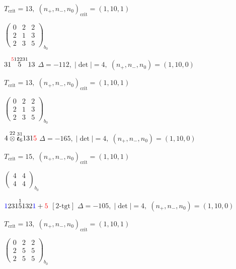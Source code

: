\documentclass[10pt]{article}
\begin{document}
\hspace{1em}$T_{\text{crit}}=13,\; (n_+,n_-,n_0)_{\text{crit}}=(1,10,1)$

\hspace{2em}$\left(\begin{smallmatrix}0 & 2 & 2 \\ 2 & 1 & 3 \\ 2 & 3 & 5\end{smallmatrix}\right)_{\!b_0}$

\smallskip

$31\overset{\textcolor{red}{5}12231}{5}13$ \quad $\Delta=-112,\; |\det|=4,\; (n_+,n_-,n_0)=(1,10,0)$

\hspace{1em}$T_{\text{crit}}=13,\; (n_+,n_-,n_0)_{\text{crit}}=(1,10,1)$

\hspace{2em}$\left(\begin{smallmatrix}0 & 2 & 2 \\ 2 & 1 & 3 \\ 2 & 3 & 5\end{smallmatrix}\right)_{\!b_0}$

\smallskip

$4\overset{22}{\otimes}\overset{31}{\mathfrak{e}_6}131\textcolor{red}{5}$ \quad $\Delta=-165,\; |\det|=4,\; (n_+,n_-,n_0)=(1,10,0)$

\hspace{1em}$T_{\text{crit}}=15,\; (n_+,n_-,n_0)_{\text{crit}}=(1,10,1)$

\hspace{2em}$\left(\begin{smallmatrix}4 & 4 \\ 4 & 4\end{smallmatrix}\right)_{\!b_0}$

\smallskip

$\textcolor{blue}{1}231\overset{1}{5}132\textcolor{blue}{1}+\textcolor{red}{5}$ $\scriptstyle [2\text{-tgt}]$ \quad $\Delta=-105,\; |\det|=4,\; (n_+,n_-,n_0)=(1,10,0)$

\hspace{1em}$T_{\text{crit}}=13,\; (n_+,n_-,n_0)_{\text{crit}}=(1,10,1)$

\hspace{2em}$\left(\begin{smallmatrix}0 & 2 & 2 \\ 2 & 5 & 5 \\ 2 & 5 & 5\end{smallmatrix}\right)_{\!b_0}$
\end{document}
